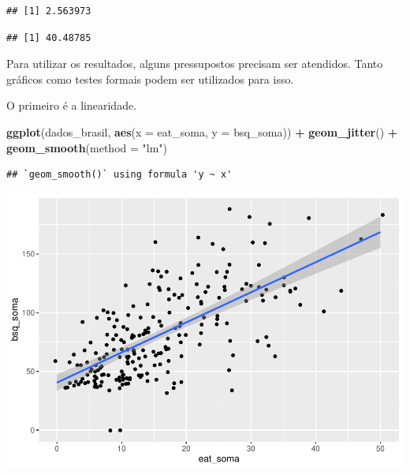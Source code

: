 \documentclass[
]{book}
\newenvironment{Shaded}{\begin{snugshade}}{\end{snugshade}}
\newcommand{\DataTypeTok}[1]{\textcolor[rgb]{0.13,0.29,0.53}{#1}}
\newcommand{\KeywordTok}[1]{\textcolor[rgb]{0.13,0.29,0.53}{\textbf{#1}}}
\newcommand{\NormalTok}[1]{#1}
\newcommand{\OperatorTok}[1]{\textcolor[rgb]{0.81,0.36,0.00}{\textbf{#1}}}
\newcommand{\StringTok}[1]{\textcolor[rgb]{0.31,0.60,0.02}{#1}}
\begin{document}
\begin{verbatim}
## [1] 2.563973
\end{verbatim}

\begin{Shaded}
\end{Shaded}

\begin{verbatim}
## [1] 40.48785
\end{verbatim}

Para utilizar os resultados, alguns pressupostos precisam ser atendidos. Tanto gráficos como testes formais podem ser utilizados para isso.

O primeiro é a linearidade.

\begin{Shaded}
\begin{Highlighting}[]
\KeywordTok{ggplot}\NormalTok{(dados_brasil, }\KeywordTok{aes}\NormalTok{(}\DataTypeTok{x =}\NormalTok{ eat_soma, }\DataTypeTok{y =}\NormalTok{ bsq_soma)) }\OperatorTok{+}
\StringTok{  }\KeywordTok{geom_jitter}\NormalTok{() }\OperatorTok{+}
\StringTok{  }\KeywordTok{geom_smooth}\NormalTok{(}\DataTypeTok{method =} \StringTok{"lm"}\NormalTok{)}
\end{Highlighting}
\end{Shaded}

\begin{verbatim}
## `geom_smooth()` using formula 'y ~ x'
\end{verbatim}

\begin{center}\includegraphics{gitbook-demo_files/figure-latex/unnamed-chunk-102-1} \end{center}
\end{document}

